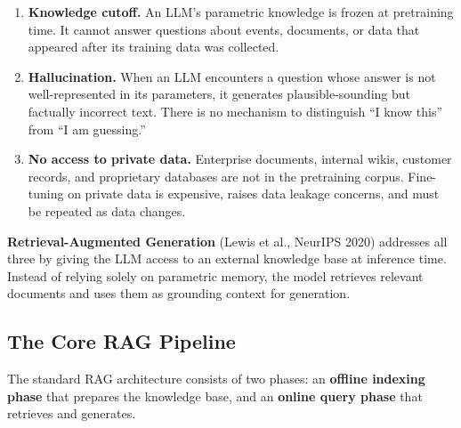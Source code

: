 \begin{enumerate}
    \item \textbf{Knowledge cutoff.}  An LLM's parametric knowledge is frozen
          at pretraining time.  It cannot answer questions about events,
          documents, or data that appeared after its training data was collected.
    \item \textbf{Hallucination.}  When an LLM encounters a question whose
          answer is not well-represented in its parameters, it generates
          plausible-sounding but factually incorrect text.  There is no
          mechanism to distinguish ``I know this'' from ``I am guessing.''
    \item \textbf{No access to private data.}  Enterprise documents, internal
          wikis, customer records, and proprietary databases are not in the
          pretraining corpus.  Fine-tuning on private data is expensive,
          raises data leakage concerns, and must be repeated as data changes.
\end{enumerate}

\textbf{Retrieval-Augmented Generation} (Lewis et al., NeurIPS 2020) addresses
all three by giving the LLM access to an external knowledge base at inference
time.  Instead of relying solely on parametric memory, the model retrieves
relevant documents and uses them as grounding context for generation.

\subsection{The Core RAG Pipeline}

The standard RAG architecture consists of two phases: an \textbf{offline
indexing phase} that prepares the knowledge base, and an \textbf{online query
phase} that retrieves and generates.

